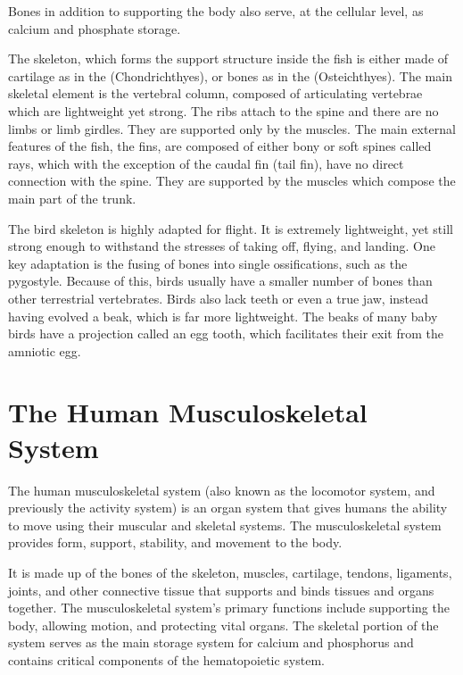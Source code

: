 Bones in addition to supporting the body also serve, at the cellular level, as calcium and phosphate storage.

The skeleton, which forms the support structure inside the fish is either made of cartilage as in the (Chondrichthyes), or bones as in the (Osteichthyes). The main skeletal element is the vertebral column, composed of articulating vertebrae which are lightweight yet strong. The ribs attach to the spine and there are no limbs or limb girdles. They are supported only by the muscles. The main external features of the fish, the fins, are composed of either bony or soft spines called rays, which with the exception of the caudal fin (tail fin), have no direct connection with the spine. They are supported by the muscles which compose the main part of the trunk.

The bird skeleton is highly adapted for flight. It is extremely lightweight, yet still strong enough to withstand the stresses of taking off, flying, and landing. One key adaptation is the fusing of bones into single ossifications, such as the pygostyle. Because of this, birds usually have a smaller number of bones than other terrestrial vertebrates. Birds also lack teeth or even a true jaw, instead having evolved a beak, which is far more lightweight. The beaks of many baby birds have a projection called an egg tooth, which facilitates their exit from the amniotic egg.

\hypertarget{the-human-musculoskeletal-system}{%
\section{The Human Musculoskeletal System}\label{the-human-musculoskeletal-system}}

The human musculoskeletal system (also known as the locomotor system, and previously the activity system) is an organ system that gives humans the ability to move using their muscular and skeletal systems. The musculoskeletal system provides form, support, stability, and movement to the body.

It is made up of the bones of the skeleton, muscles, cartilage, tendons, ligaments, joints, and other connective tissue that supports and binds tissues and organs together. The musculoskeletal system's primary functions include supporting the body, allowing motion, and protecting vital organs. The skeletal portion of the system serves as the main storage system for calcium and phosphorus and contains critical components of the hematopoietic system.

